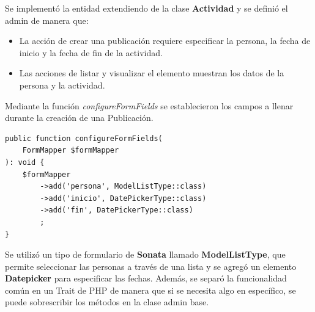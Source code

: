 
Se implementó la entidad extendiendo de la clase \textbf{Actividad} y se definió el admin de manera que:

\begin{itemize}
    \item La acción de crear una publicación requiere especificar la persona, la fecha de inicio y la fecha de fin de la actividad.
    \item Las acciones de listar y visualizar el elemento muestran los datos de la persona y la actividad.
\end{itemize}

Mediante la función \textit{configureFormFields} se establecieron los campos a llenar durante la creación de una Publicación.

\begin{lstlisting}[caption={Definición de campos durante la creación de Publiciaciones.\\Fuente: Elaboración propia}]
public function configureFormFields(
    FormMapper $formMapper
): void {
    $formMapper
        ->add('persona', ModelListType::class)
        ->add('inicio', DatePickerType::class)
        ->add('fin', DatePickerType::class)
        ;
}
\end{lstlisting}

Se utilizó un tipo de formulario de \textbf{Sonata} llamado \textbf{ModelListType}, que permite seleccionar las personas a través de una lista y se agregó
un elemento \textbf{Datepicker} para especificar
las fechas\@. Además, se separó la funcionalidad común en un Trait de PHP de manera que si se necesita algo en específico, se puede sobrescribir los métodos
en la clase admin base.
